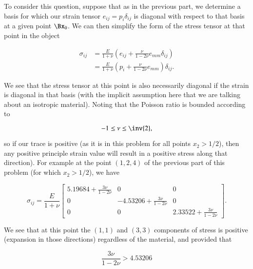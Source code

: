 \begin{Answer}[ref={problem:continuumProblemSet1:q2b}]

To consider this question, suppose that as in the previous part, we determine a basis for which our strain tensor $e_{ij} = p_i \delta_{ij}$ is diagonal with respect to that basis at a given point $\Bx_0$.  We can then simplify the form of the stress tensor at that point in the object

\begin{align*}
\sigma_{ij}
&=
\frac{E}{1 + \nu} \left(
e_{ij} + \frac{\nu}{1 - 2 \nu} e_{mm} \delta_{ij}
\right) \\
&=
\frac{E}{1 + \nu} \left(
p_i
 + \frac{\nu}{1 - 2 \nu} e_{mm}
\right)
\delta_{ij}.
\end{align*}

We see that the stress tensor at this point is also necessarily diagonal if the strain is diagonal in that basis (with the implicit assumption here that we are talking about an isotropic material).  Noting that the Poisson ratio is bounded according to

\begin{equation}\label{eqn:continuumProblemSet1:350}
-1 \le \nu \le \inv{2},
\end{equation}

so if our trace is positive (as it is in this problem for all points $x_2 > 1/2$), then any positive principle strain value will result in a positive stress along that direction).  For example at the point $(1,2,4)$ of the previous part of this problem (for which $x_2 > 1/2$), we have

\begin{equation}\label{eqn:continuumProblemSet1:370}
\sigma_{ij}
=
\frac{E}{1 + \nu}
\begin{bmatrix}
5.19684
+ \frac{3 \nu}{1 - 2 \nu}  & 0 & 0 \\
0 & -4.53206
+ \frac{3 \nu}{1 - 2 \nu}  & 0 \\
0 & 0 & 2.33522
+ \frac{3 \nu}{1 - 2 \nu}
\end{bmatrix}.
\end{equation}

We see that at this point the $(1,1)$ and $(3,3)$ components of stress is positive (expansion in those directions) regardless of the material, and provided that

\begin{equation}\label{eqn:continuumProblemSet1:390}
\frac{3 \nu}{1 - 2 \nu} > 4.53206
\end{equation}


\end{Answer}
